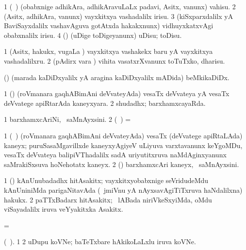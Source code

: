 {{{{\bentry
{} 
\gl{\sakirx}
\expl{}
\bmng
\bnum
\num{1} (\kanmu\ \kaparx) (obabxnige adhikAra, adhikAravuLaLx padavi, Asitx, \mo vanunx) vahisu. 
\num{2} (Asitx, adhikAra, \mo vanunx) vayxkitxya vashadalilx irisu. 
\num{3} (kiSxparxdalilx yA BaviSayxdalilx vashavAguva gotAtxda hakakxnunx) vidhuyxkatxvAgi obabxnalilx irisu. 
\num{4} (\kAparx) (uDige toDigeyanunx) uDisu; toDisu. 
\enum
\emng

\noindent 
\gl{\akirx}
\expl{}
\bmng
\bnum
\num{1} (Asitx, hakukx, \mo vugaLa \vi) vayxkitxya vashakekx baru yA vayxkitxya vashadalilxru. 
\num{2} (pAdirx \mo vara \vi) vihita vasatxrXvanunx toTuTxko, dharisu. 
\enum
\emng
\eentry

\bentry
{} 
\gl{\nA}
\expl{}
\bmng
 (\ca) (marada kaDiDxyalilx yA aragina kaDiDxyalilx mADida) beMkikaDiDx. 
\emng
\eentry

\bentry
{} 
\gl{\gu}
\expl{}
\bmng
\bnum
\num{1} (\roVpu) (roVmanara gaqhABimAni deVvateyAda) vesaTx deVvateya yA vesaTx deVvatege apiRtarAda kaneyxyara. 
\num{2} shudadhx; barxhamxcayaRda. 
\enum
\emng
\eentry

\bentry
{} 
\gl{\nA}
\expl{}
\bmng
\bnum
\num{1} barxhamxcAriNi, \kanmu\ saMnAyxsini. 
\num{2} (\roV\ \pArxkatx) =  
\enum
\emng
\eentry

\bentry
{}
\gl{\nA}
\expl{}
\bmng
\bnum
\num{1} (\roV\ \pArxkatx) (roVmanara gaqhABimAni deVvateyAda) vesaTx (deVvatege apiRtaLAda) kaneyx; puruSasaMgavillxde kaneyxyAgiyeV uLiyuva varxtavanunx keYgoMDu, vesaTx deVvateya balipiVThadalilx sadA uriyutitxruva naMdAginxyanunx saMrakiSxsuva hoNehotatx kaneyx. 
\num{2} (\rUpa) barxhamxcAri kaneyx, \kanmu\ saMnAyxsini. 
\enum
\emng
\eentry

\bentry
{} 
\gl{\nA}
\expl{}
\bmng
\bnum
\num{1} (\nAyxshA) kAnUnubadadhx hitAsakitx; vayxkitxyobabxnige seVridudeMdu kAnUniniMda parigaNitavAda (\sA\ jmiVnu yA nAyxsavAgiTiTxruva haNdalilxna) hakukx. 
\num{2} paTTxBadarx hitAsakitx; \sA\ lABada niriVkeSxyiMda, oMdu viSayadalilx iruva veYyakitxka Asakitx. 
\enum
\emng
\eentry

\bentry
{} 
\gl{\nA}
\expl{}
\bmng
 =  
\emng
\eentry

\bentry
{} 
\gl{\nA}(\bava\ ). 
\bmng
\bnum
\num{1}  
\num{2} uDupu koVNe; baTeTxbare hAkikoLaLxlu iruva koVNe. 
\enum
\emng
\eentry

}}}}
